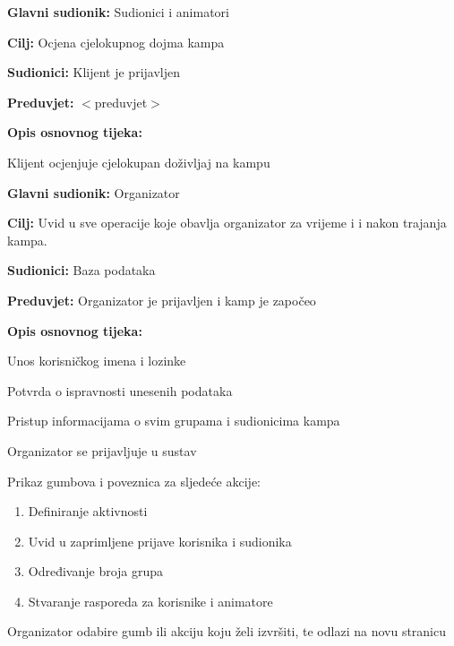 \noindent {}
\begin{packed_item}

	\item \textbf{Glavni sudionik: }Sudionici i animatori
	\item  \textbf{Cilj:} Ocjena cjelokupnog dojma kampa
	\item  \textbf{Sudionici:} Klijent je prijavljen
	\item  \textbf{Preduvjet:} $<$preduvjet$>$
	\item  \textbf{Opis osnovnog tijeka:}

	\item[] \begin{packed_enum}

				\item Klijent ocjenjuje cjelokupan doživljaj na kampu
	\end{packed_enum}


\end{packed_item}
\vspace{5mm} %

\noindent {}
\begin{packed_item}

	\item \textbf{Glavni sudionik: }Organizator
	\item  \textbf{Cilj:} Uvid u sve operacije koje obavlja organizator za vrijeme i i nakon trajanja          kampa.
	\item  \textbf{Sudionici:} Baza podataka
	\item  \textbf{Preduvjet:} Organizator je prijavljen i kamp je započeo
	\item  \textbf{Opis osnovnog tijeka:}

	\item[] \begin{packed_enum}
				\item Unos korisničkog imena i lozinke
				\item Potvrda o ispravnosti unesenih podataka
				\item Pristup informacijama o svim grupama i sudionicima kampa
				\item Organizator se prijavljuje u sustav
				\item Prikaz gumbova i poveznica za sljedeće akcije:
				\begin{enumerate}
					\item Definiranje aktivnosti
					\item Uvid u zaprimljene prijave korisnika i sudionika
					\item Određivanje broja grupa
					\item Stvaranje rasporeda za korisnike i animatore
				\end{enumerate}
				\item Organizator odabire gumb ili akciju koju želi izvršiti, te odlazi na novu stranicu
	\end{packed_enum}


\end{packed_item}

